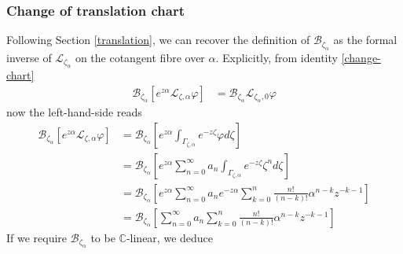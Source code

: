 \documentclass{article}
\theoremstyle{definition}
\newcommand{\C}{\mathbb{C}}
\newcommand{\laplace}{\mathcal{L}}
\newcommand{\borel}{\mathcal{B}}
\begin{document}
\subsubsection{Change of translation chart}\label{transl-borel}

Following Section \ref{translation}, we can recover the definition of $\borel_{\zeta_\alpha}$
as the formal inverse of $\laplace_{\zeta_\alpha}$ on the cotangent fibre over $\alpha$. Explicitly, from identity \eqref{change-chart}
  \begin{align*}
      \borel_{\zeta_\alpha}\left[e^{z\alpha} \laplace_{\zeta,\alpha}\varphi\right]&=\borel_{\zeta_\alpha}\laplace_{\zeta_\alpha,0}\varphi
  \end{align*}
  now the left-hand-side reads
  \begin{align*}
      \borel_{\zeta_\alpha}\left[e^{z\alpha} \laplace_{\zeta,\alpha}\varphi\right]&=\borel_{\zeta_\alpha}\left[e^{z\alpha} \int_{\Gamma_{\zeta,\alpha}}e^{-z\zeta}\varphi d\zeta\right]\\
      &=\borel_{\zeta_\alpha}\left[e^{z\alpha} \sum_{n=0}^{\infty}a_n\int_{\Gamma_{\zeta,\alpha}}e^{-z\zeta}\zeta^n d\zeta\right]\\
      &=\borel_{\zeta_\alpha}\left[e^{z\alpha} \sum_{n=0}^{\infty}a_ne^{-z\alpha}\sum_{k=0}^{n}\frac{n!}{(n-k)!}\alpha^{n-k}z^{-k-1}\right]\\
      &=\borel_{\zeta_\alpha}\left[\sum_{n=0}^{\infty}a_n \sum_{k=0}^{n}\frac{n!}{(n-k)!}\alpha^{n-k}  z^{-k-1}\right]
  \end{align*}
     If we require $\borel_{\zeta_\alpha}$ to be $\C$-linear, we deduce 
\end{document}
